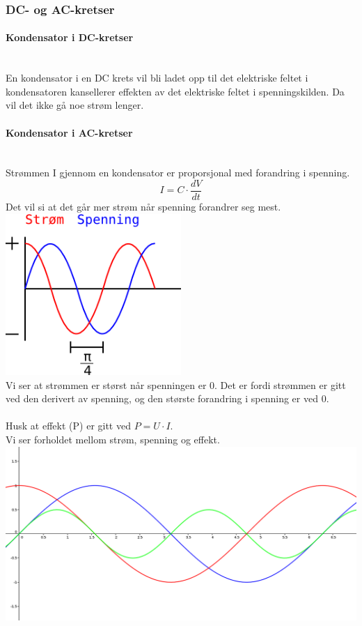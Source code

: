 \subsubsection{DC- og AC-kretser}
\paragraph{Kondensator i DC-kretser} \mbox{} \\
En kondensator i en DC krets vil bli ladet opp
til det elektriske feltet i kondensatoren kansellerer effekten av
det elektriske feltet i spenningskilden.
Da vil det ikke gå noe strøm lenger.

\paragraph{Kondensator i AC-kretser} \mbox{} \\
Strømmen I gjennom en kondensator er proporsjonal med forandring i spenning.
$$I = C \cdot \frac{dV}{dt}$$
Det vil si at det går mer strøm når spenning forandrer seg mest. \\
\includegraphics[width=0.5\textwidth]{./img/kondensator-spenning} \\
Vi ser at strømmen er størst når spenningen er 0.
Det er fordi strømmen er gitt ved den derivert av spenning,
og den største forandring i spenning er ved 0.
\\\\
Husk at {\color{green} effekt (P)} er gitt ved $P = U \cdot I$. \\
Vi ser forholdet mellom strøm, spenning og effekt. \\
\includegraphics[width=\textwidth]{./img/kondensator-power} \\



